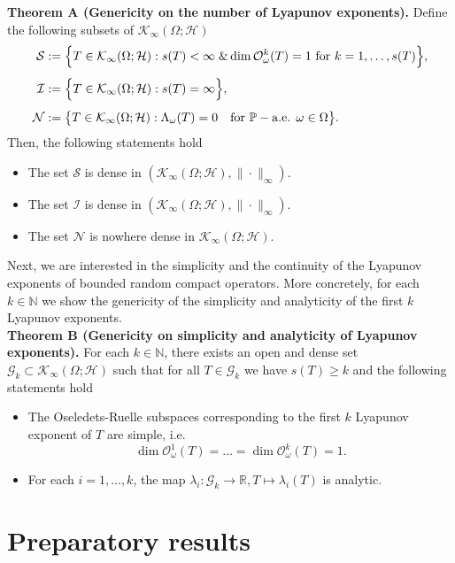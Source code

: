 \documentclass[pdflatex,sn-mathphys-num]{sn-jnl}%
\theoremstyle{thmstyleone}%
\theoremstyle{thmstyletwo}%
\theoremstyle{thmstylethree}%
\newcommand{\N}{\mathbb{N}}
\newcommand{\R}{\mathbb{R}}
\newcommand{\mP}{\mathbb{P}}
\numberwithin{equation}{section}
\begin{document}
\noindent
\textbf{Theorem A (Genericity on the number of Lyapunov exponents).}  Define the following subsets of $ \mathcal K_{\infty}(\Omega;\mathcal H)$ 
\begin{align}
\mathcal S
& :=\Big\{T\in \mathcal K_{\infty}(\Omega;\mathcal H): s(T)<\infty\; \& \dim \mathcal O^k_{\omega}(T)=1\hbox{ for } k=1,\dots, s(T) \Big\}, \label{SimpleLE}\\[1ex]
\mathcal I
& :=\Big\{T\in \mathcal K_{\infty}(\Omega;\mathcal H): s(T)=\infty\Big\}\label{InfinteLE},\\[1ex]
\mathcal N
&:=\big\{ T\in \mathcal K_{\infty}(\Omega;\mathcal H): \Lambda_{\omega}(T)=0\quad \hbox{for } \mP-\hbox{a.e. } \omega\in\Omega\big\}.\label{Nullset}
\end{align}
Then, the following statements hold
\begin{itemize}
    \item [(i)] The set $\mathcal S$ is dense in $(\mathcal K_{\infty}(\Omega;\mathcal H),\|\cdot\|_{\infty})$.
    \item [(ii)] The set $\mathcal I$ is dense in $(\mathcal K_{\infty}(\Omega;\mathcal H),\|\cdot\|_{\infty})$.
    \item [(iii)] The set $\mathcal N$ is nowhere dense in $\mathcal K_{\infty}(\Omega;\mathcal H)$.
\end{itemize}
Next, we are interested in the simplicity and the continuity of the Lyapunov exponents of bounded random compact operators. More concretely, for each $k\in\N$  we show the genericity of the simplicity and analyticity of the first $k$ Lyapunov exponents.\\ 

\noindent
\textbf{Theorem B (Genericity on simplicity and analyticity of Lyapunov exponents).} For each $k\in\N$, there exists an open and dense set $\mathcal G_k\subset \mathcal K_{\infty}(\Omega;\mathcal H)$ such that for all $T\in \mathcal G_k$ we have $s(T)\geq k$ and the following statements hold
\begin{itemize}
\item [(i)] The Oseledets-Ruelle subspaces corresponding to the first $k$ Lyapunov exponent of $T$ are simple, i.e.
\[
\dim \mathcal O^1_{\omega}(T)=\dots=\dim \mathcal O^k_{\omega}(T)=1.
\]
\item [(ii)] For each $i=1,\dots,k$, the map $\lambda_i:\mathcal G_k\rightarrow \R, T\mapsto \lambda_i(T)$ is analytic.
\end{itemize}
%


\section{Preparatory results}\label{Prepartoryresults}
%
%
%
\end{document}
